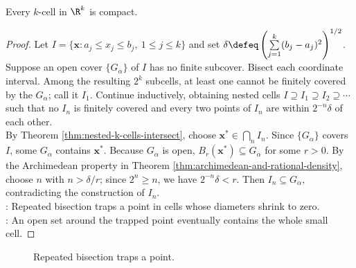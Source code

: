 \begin{theorem} \label{thm:k-cells-compact} \\
Every $k$-cell in $\R^k$ is compact.
\begin{proof}
Let $I=\{\mathbf{x}:a_j\leq x_j\leq b_j,\ 1\leq j\leq k\}$ and set $\delta\defeq\left(\sum
\limits_{j=1}^{k}(b_j-a_j)^2\right)^{1/2}$. Suppose an open cover $\{G_\alpha\}$ of $I$ has no finite subcover. Bisect each coordinate interval. Among the resulting $2^k$ subcells, at least one cannot be finitely covered by the $G_\alpha$; call it $I_1$. Continue inductively, obtaining nested cells $I\supseteq I_1\supseteq I_2\supseteq\cdots$ such that no $I_n$ is finitely covered and every two points of $I_n$ are within $2^{-n}\delta$ of each other.\\
By Theorem \ref{thm:nested-k-cells-intersect}, choose $\mathbf{x}^*\in\bigcap_n I_n$. Since $\{G_\alpha\}$ covers $I$, some $G_\alpha$ contains $\mathbf{x}^*$. Because $G_\alpha$ is open, $B_r(\mathbf{x}^*)\subseteq G_\alpha$ for some $r>0$. By the Archimedean property in Theorem \ref{thm:archimedean-and-rational-density}, choose $n$ with $n>\delta/r$; since $2^n\geq n$, we have $2^{-n}\delta<r$. Then $I_n\subseteq G_\alpha$, contradicting the construction of $I_n$.\\
: Repeated bisection traps a point in cells whose diameters shrink to zero.\\
: An open set around the trapped point eventually contains the whole small cell.
\end{proof}
\end{theorem}

\begin{figure}[H]
  \centering
  
  \caption{Repeated bisection traps a point.}
  \label{fig:k-cell-bisection-compactness}
\end{figure}

